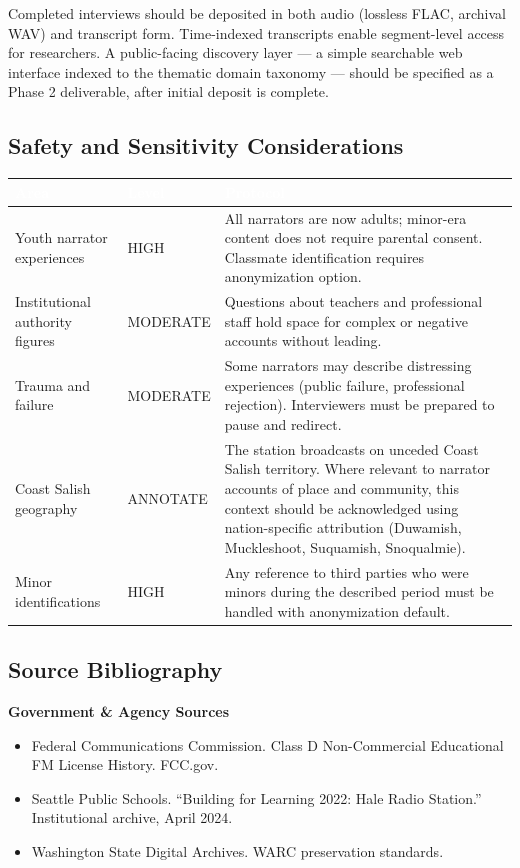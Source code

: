 \documentclass[11pt,letterpaper]{article}
\newcommand{\tableheader}[1]{\textbf{\sffamily\textcolor{white}{#1}}}
\begin{document}
Completed interviews should be deposited in both audio (lossless FLAC, archival WAV) and transcript form. Time-indexed transcripts enable segment-level access for researchers. A public-facing discovery layer --- a simple searchable web interface indexed to the thematic domain taxonomy --- should be specified as a Phase 2 deliverable, after initial deposit is complete.

\subsection{Safety and Sensitivity Considerations}

\begin{center}
\begin{tabularx}{\textwidth}{L{3.5cm}L{2cm}X}
\toprule
{}
\tableheader{Area} & \tableheader{Level} & \tableheader{Protocol} \\
\midrule
Youth narrator experiences & HIGH & All narrators are now adults; minor-era content does not require parental consent. Classmate identification requires anonymization option. \\
Institutional authority figures & MODERATE & Questions about teachers and professional staff hold space for complex or negative accounts without leading. \\
Trauma and failure & MODERATE & Some narrators may describe distressing experiences (public failure, professional rejection). Interviewers must be prepared to pause and redirect. \\
Coast Salish geography & ANNOTATE & The station broadcasts on unceded Coast Salish territory. Where relevant to narrator accounts of place and community, this context should be acknowledged using nation-specific attribution (Duwamish, Muckleshoot, Suquamish, Snoqualmie). \\
Minor identifications & HIGH & Any reference to third parties who were minors during the described period must be handled with anonymization default. \\
\bottomrule
\end{tabularx}
\end{center}

\subsection{Source Bibliography}

\textbf{Government \& Agency Sources}
\begin{itemize}
  \item Federal Communications Commission. Class D Non-Commercial Educational FM License History. FCC.gov.
  \item Seattle Public Schools. ``Building for Learning 2022: Hale Radio Station.'' Institutional archive, April 2024.
  \item Washington State Digital Archives. WARC preservation standards.
\end{itemize}
\end{document}
